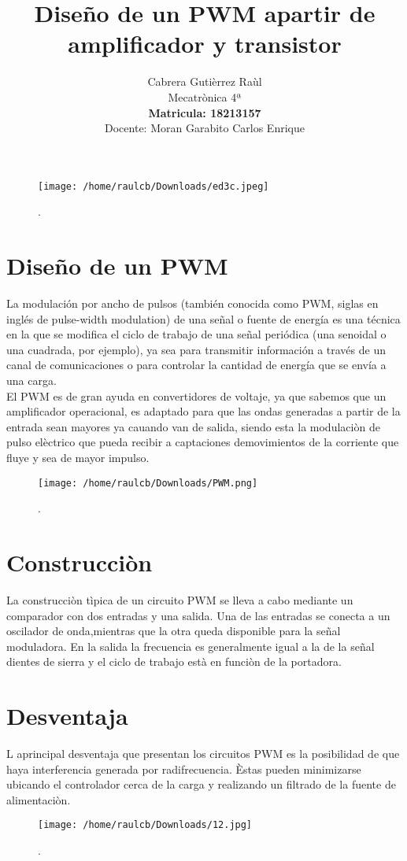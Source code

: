 \documentclass[11pt]{article}
\title{\textbf{Diseño de un PWM apartir de amplificador y transistor}}
\author{Cabrera Gutièrrez Raùl
\\ 
Mecatrònica 4ª
\\ \textbf{Matricula: 18213157}
\\ Docente: Moran Garabito Carlos Enrique}
\date{}
\begin{document}
\begin{figure}[htp]
\centering
\texttt{[image: /home/raulcb/Downloads/ed3c.jpeg]}
\caption{.}
\label{.}
\end{figure}

\maketitle
\section{Diseño de un PWM}
La modulación por ancho de pulsos (también conocida como PWM, siglas en inglés de pulse-width modulation) de una señal o fuente de energía es una técnica en la que se modifica el ciclo de trabajo de una señal periódica (una senoidal o una cuadrada, por ejemplo), ya sea para transmitir información a través de un canal de comunicaciones o para controlar la cantidad de energía que se envía a una carga.
\\

El PWM es de gran ayuda en convertidores de voltaje, ya que sabemos que un amplificador operacional, es adaptado para que las ondas generadas a partir de la entrada sean mayores ya cauando van de salida, siendo esta la modulaciòn de pulso elèctrico que pueda recibir a captaciones demovimientos de la corriente que fluye y sea de mayor impulso.

\begin{figure}[htp]
\centering
\texttt{[image: /home/raulcb/Downloads/PWM.png]}
\caption{.}
\label{.}
\end{figure}


\section{Construcciòn}
La construcciòn tìpica de un circuito PWM  se lleva a cabo mediante un comparador con dos entradas y una salida. Una de las entradas se conecta a un oscilador de onda,mientras que la otra queda disponible para la señal moduladora. En la salida la frecuencia es generalmente igual a la de la señal dientes de sierra y el ciclo de trabajo està en funciòn de la portadora.


\section{Desventaja}
L aprincipal desventaja que presentan los circuitos PWM es la posibilidad de que haya interferencia generada por radifrecuencia. Èstas pueden minimizarse ubicando el controlador cerca de la carga y realizando un filtrado de la fuente de alimentaciòn.

\begin{figure}[htp]
\centering
\texttt{[image: /home/raulcb/Downloads/12.jpg]}
\caption{.}
\label{.}
\end{figure}
\end{document}

